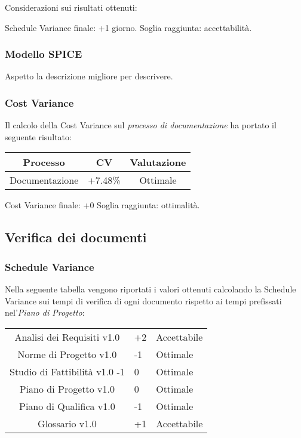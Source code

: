 Considerazioni sui risultati ottenuti:

Schedule Variance finale: +1 giorno.
Soglia raggiunta: accettabilità.

\subsubsection{Modello SPICE}
Aspetto la descrizione migliore per descrivere.

\subsubsection{Cost Variance}
Il calcolo della Cost Variance sul \emph{processo di documentazione} ha portato il seguente risultato: 

{
\renewcommand{\arraystretch}{2}
\centering
\begin{tabular}{|c | c | c |}
	\hline
	Processo & CV & Valutazione \\
	\hline
	Documentazione & +7.48\% & Ottimale \\
	\hline
\end{tabular}

}

Cost Variance finale: +0%
Soglia raggiunta: ottimalità.

\subsection{Verifica dei documenti}
\subsubsection{Schedule Variance}
Nella seguente tabella vengono riportati i valori ottenuti calcolando la Schedule Variance sui tempi di verifica di ogni documento rispetto ai tempi prefissati nel'\textit{Piano di Progetto}:

{
	\renewcommand{\arraystretch}{2}
	\centering
	\begin{tabular}{| c | R{0.5cm} | C{3cm} |}
		\hline
		Analisi dei Requisiti v1.0 & +2 & Accettabile \\
		Norme di Progetto v1.0 & -1 & Ottimale \\
		Studio di Fattibilità v1.0 -1 &  0 &  Ottimale \\
		Piano di Progetto v1.0 &  0 &  Ottimale\\
		Piano di Qualifica v1.0 & -1 & Ottimale \\
		Glossario v1.0 & +1 & Accettabile\\	
		\hline
	\end{tabular}

}

